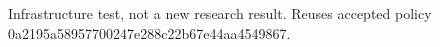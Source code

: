 Infrastructure test, not a new research result. Reuses accepted policy 0a2195a58957700247e288c22b67e44aa4549867.
